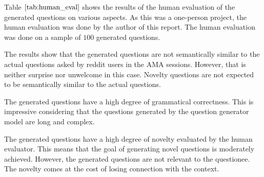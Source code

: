 \documentclass[paper=a4, fontsize=11pt]{scrartcl}
\numberwithin{equation}{section}		%
\numberwithin{figure}{section}			%
\numberwithin{table}{section}				%
\begin{document}
Table $\ref{tab:human_eval}$ shows the results of the human evaluation of the generated questions on various aspects.
As this was a one-person project, the human evaluation was done by the author of this report.
The human evaluation was done on a sample of $100$ generated questions.

The results show that the generated questions are not semantically similar to the actual questions asked by reddit users in the AMA sessions.
However, that is neither surprise nor unwelcome in this case.
Novelty questions are not expected to be semantically similar to the actual questions.

The generated questions have a high degree of grammatical correctness.
This is impressive considering that the questions generated by the question generator model are long and complex.

The generated questions have a high degree of novelty evaluated by the human evaluator.
This means that the goal of generating novel questions is moderately achieved.
However, the generated questions are not relevant to the questionee.
The novelty comes at the cost of losing connection with the context.
\end{document}
